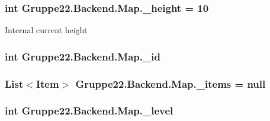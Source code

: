 \hypertarget{class_gruppe22_1_1_backend_1_1_map_a69879990b9ce22a9fa0d31454d068b32}{
\subsubsection[{\-\_\-height}]{\setlength{\rightskip}{0pt plus 5cm}int Gruppe22.\-Backend.\-Map.\-\_\-height = 10\hspace{0.3cm}{\ttfamily [protected]}}}\label{class_gruppe22_1_1_backend_1_1_map_a69879990b9ce22a9fa0d31454d068b32}


Internal current height 

\hypertarget{class_gruppe22_1_1_backend_1_1_map_a09dec3f5d4010c7f0f3578e5de84d01b}{
\subsubsection[{\-\_\-id}]{\setlength{\rightskip}{0pt plus 5cm}int Gruppe22.\-Backend.\-Map.\-\_\-id\hspace{0.3cm}{\ttfamily [protected]}}}\label{class_gruppe22_1_1_backend_1_1_map_a09dec3f5d4010c7f0f3578e5de84d01b}
\hypertarget{class_gruppe22_1_1_backend_1_1_map_a07ce05356ba78ac1470d64e0c736e190}{
\subsubsection[{\-\_\-items}]{\setlength{\rightskip}{0pt plus 5cm}List$<${\bf Item}$>$ Gruppe22.\-Backend.\-Map.\-\_\-items = null\hspace{0.3cm}{\ttfamily [protected]}}}\label{class_gruppe22_1_1_backend_1_1_map_a07ce05356ba78ac1470d64e0c736e190}
\hypertarget{class_gruppe22_1_1_backend_1_1_map_a90048a67b858c4e4e5e3937785a59c83}{
\subsubsection[{\-\_\-level}]{\setlength{\rightskip}{0pt plus 5cm}int Gruppe22.\-Backend.\-Map.\-\_\-level\hspace{0.3cm}{\ttfamily [protected]}}}\label{class_gruppe22_1_1_backend_1_1_map_a90048a67b858c4e4e5e3937785a59c83}
